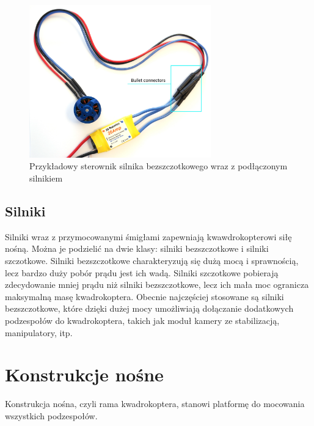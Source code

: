 \begin{figure}[H]
	\centering
		\includegraphics[width=0.7\textwidth]{Pictures/esc-motor-connect.jpg}
	\caption[Przykładowy sterownik silnika bezszczotkowego]{Przykładowy sterownik silnika bezszczotkowego wraz z podłączonym silnikiem~\cite{quadro20}}
	\label{fig:esc-motor-connect.jpg}
\end{figure}


\subsection{Silniki}

Silniki wraz z przymocowanymi śmigłami zapewniają kwawdrokopterowi siłę nośną. Można je podzielić na dwie klasy: silniki bezszczotkowe i silniki szczotkowe. Silniki bezszczotkowe charakteryzują się dużą mocą i sprawnością, lecz bardzo duży pobór prądu jest ich wadą. Silniki szczotkowe pobierają zdecydowanie mniej prądu niż silniki bezszczotkowe, lecz ich mała moc ogranicza maksymalną masę kwadrokoptera. Obecnie najczęściej stosowane są silniki bezszczotkowe, które dzięki dużej mocy umożliwiają dołączanie dodatkowych podzespołów do kwadrokoptera, takich jak moduł kamery ze stabilizacją, manipulatory, itp.


\section{Konstrukcje nośne}

Konstrukcja nośna, czyli rama kwadrokoptera, stanowi platformę do mocowania wszystkich podzespołów. 

